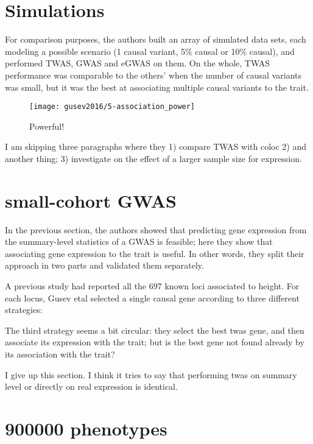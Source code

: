\documentclass[../main.tex]{subfiles}
\begin{document}

\section{Simulations}

For comparison purposes, the authors built an array of simulated data 
sets, each modeling a possible scenario (1 causal variant, 5\% causal or 
10\% causal), and performed TWAS, GWAS and eGWAS on them. On the whole, 
TWAS performance was comparable to the others' when the number of causal 
variants was small, but it was the best at associating multiple causal 
variants to the trait.

\begin{figure}
	\texttt{[image: gusev2016/5-association\_power]}
	\caption{Powerful!}
\end{figure}

I am skipping three paragraphs where they 1) compare TWAS with coloc 
2) and another thing; 3) investigate on the effect of a larger sample 
   size for expression.

\section{small-cohort GWAS}

In the previous section, the authors showed that predicting gene 
expression from the summary-level statistics of a GWAS is feasible; here 
they show that associating gene expression to the trait is useful. In 
other words, they split their approach in two parts and validated them 
separately.

A previous study had reported all the 697 known loci associated to 
height. For each locus, Gusev etal selected a single causal gene 
according to three different strategies:

The third strategy seems a bit circular: they select the best twas gene, 
and then associate its expression with the trait; but is the best gene 
not found already by its association with the trait?

I give up this section. I think it tries to say that performing twas on 
summary level or directly on real expression is identical.

\section{900000 phenotypes}
\end{document}
